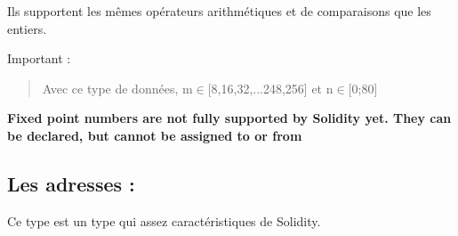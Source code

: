 \documentclass{article}
\begin{document}
Ils supportent les mêmes opérateurs arithmétiques et de comparaisons que les entiers.

\noindent Important :
\begin{quote}
    Avec ce type de données, m$\in$[8,16,32,...248,256] et n$\in$[0;80]
\end{quote}

\textbf{Fixed point numbers are not fully supported by Solidity yet. They can be declared, but cannot be assigned to or from}

\subsection{Les adresses :}
Ce type est un type qui assez caractéristiques de Solidity.
\end{document}
